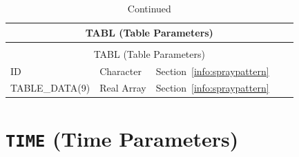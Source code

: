 \documentclass[11pt]{book}
\begin{document}
\begin{longtable}{@{\extracolsep{\fill}}|l|l|l|l|l|}
\caption[Table parameters ({\ct TABL} namelist group)]{For more information see Section~\ref{info:spraypattern}.}
\label{tbl:TABL} \\
\hline
\multicolumn{5}{|c|}{{\ct TABL} (Table Parameters)} \\
\hline \hline
\endfirsthead
\caption[]{Continued} \\
\hline
\multicolumn{5}{|c|}{{\ct TABL} (Table Parameters)} \\
\hline \hline
\endhead
{\ct ID}                & Character   & Section~\ref{info:spraypattern}      &             &     \\ \hline
{\ct TABLE\_DATA(9)}    & Real Array  & Section~\ref{info:spraypattern}      &             &     \\ \hline
\end{longtable}


\vspace{\baselineskip}


\section{\texorpdfstring{{\tt TIME}}{TIME} (Time Parameters)}
\end{document}
